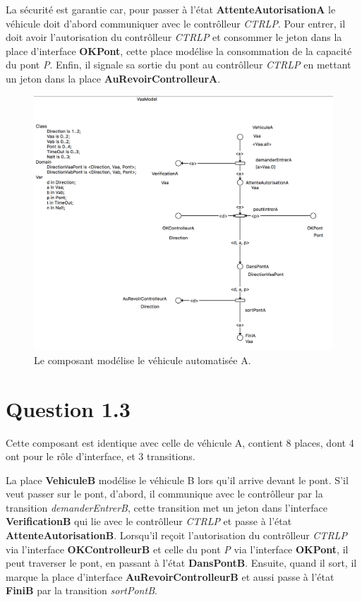 \documentclass[a4paper,11pt]{report}
\begin{document}
	La sécurité est garantie car, pour passer à l'état \textbf{AttenteAutorisationA} le véhicule doit d'abord communiquer avec le contrôlleur \textit{CTRLP}. Pour entrer, il doit avoir l'autorisation du contrôlleur \textit{CTRLP} et consommer le jeton dans la place d'interface \textbf{OKPont},  cette place modélise la consommation de la capacité du pont \textit{P}. Enfin, il signale sa sortie du pont au contrôlleur \textit{CTRLP} en mettant un jeton dans la place \textbf{AuRevoirControlleurA}.

	\begin{figure}[!htbp]
		\centering
		\includegraphics[width = 15cm]{vaaModel.png}
		\caption{Le composant modélise le véhicule automatisée A.}
	\end{figure}
	\newpage
	
\section{Question 1.3}
	Cette composant est identique avec celle de véhicule A, contient 8 places, dont 4 ont pour le rôle d'interface, et 3 transitions.
	
	La place \textbf{VehiculeB} modélise le véhicule B  lors qu'il arrive devant le pont. S'il veut passer sur le pont, d'abord, il communique avec le contrôlleur par la transition \textit{demanderEntrerB}, cette transition met un jeton dans l'interface \textbf{VerificationB} qui lie avec le contrôlleur \textit{CTRLP} et passe à l'état \textbf{AttenteAutorisationB}. Lorsqu'il reçoit l'autorisation du contrôlleur \textit{CTRLP} via l'interface \textbf{OKControlleurB} et celle du pont \textit{P} via l'interface \textbf{OKPont}, il peut traverser le pont, en passant à l'état \textbf{DansPontB}. Ensuite, quand il sort, il marque la place d'interface \textbf{AuRevoirControlleurB} et aussi passe à l'état \textbf{FiniB} par la transition \textit{sortPontB}.
	
\end{document}
